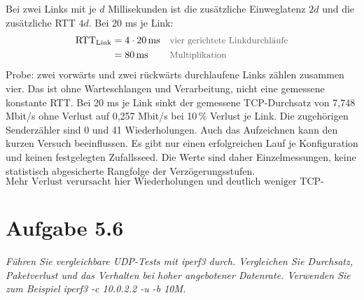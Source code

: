 \documentclass[a4paper,11pt]{article}
\newif\ifexplain
\newcommand{\aufgabe}[1]{\section*{Aufgabe #1}}
\newcommand{\angabe}[1]{\textit{#1}\par\smallskip}
\newcommand{\why}[1]{\text{\small\color{black!65}#1}}
\newcommand{\explain}[1]{\ifexplain\begin{erklbox}#1\end{erklbox}\fi}
\begin{document}
Bei zwei Links mit je $d$ Millisekunden ist die zusätzliche Einweglatenz
$2d$ und die zusätzliche RTT $4d$. Bei 20 ms je Link:
\begin{align*}
\mathrm{RTT}_{\mathrm{Link}} &= 4\cdot20\,\mathrm{ms} && \why{vier gerichtete Linkdurchläufe}\\
&= 80\,\mathrm{ms} && \why{Multiplikation}
\end{align*}
Probe: zwei vorwärts und zwei rückwärts durchlaufene Links zählen zusammen vier.
Das ist ohne Warteschlangen und Verarbeitung, nicht eine gemessene konstante RTT.
Bei 20 ms je Link sinkt der gemessene TCP-Durchsatz von 7,748 Mbit/s ohne Verlust auf 0,257 Mbit/s bei 10\,\% Verlust je Link. Die zugehörigen Senderzähler sind 0 und 41 Wiederholungen. Auch das Aufzeichnen kann den kurzen Versuch beeinflussen.
Es gibt nur einen erfolgreichen Lauf je Konfiguration und keinen festgelegten
Zufallsseed. Die Werte sind daher Einzelmessungen, keine statistisch
abgesicherte Rangfolge der Verzögerungsstufen.
\[\boxed{\text{Mehr Verlust verursacht hier Wiederholungen und deutlich weniger TCP-Nutzdurchsatz.}}\]
\explain{TCP passt sein Sendefenster an die Rückmeldungen an. Bei größerer
RTT kommt eine Rückmeldung später. Verlorene Daten müssen erneut gesendet
werden und die Überlastkontrolle reduziert die Sendemenge.
Ohne Verlust kann ein ausreichend großes Fenster die Leitung trotzdem füllen.
Deshalb muss sich der Durchsatz nicht halbieren, wenn sich die RTT verdoppelt.
Die 10-Mbit/s-Grenze betrifft den Link, der iperf-Wert die Anwendungsdaten.
Header und Anlaufphase erklären einen Teil der Differenz.
Vier Kilobyte je iperf-Schreibblock erleichtern bei hohem Verlust die zeitnahe
Empfängerzählung; das ändert nicht die MTU oder die TCP-Segmentgröße.}

\aufgabe{5.6}
\angabe{Führen Sie vergleichbare UDP-Tests mit iperf3 durch. Vergleichen Sie Durchsatz, Paketverlust und das Verhalten bei hoher angebotener Datenrate. Verwenden Sie zum Beispiel iperf3 -c 10.0.2.2 -u -b 10M.}
\end{document}
